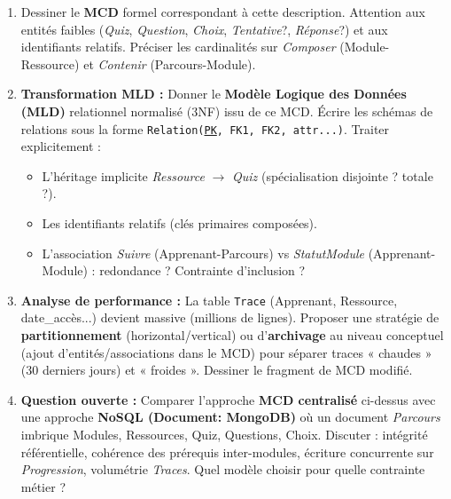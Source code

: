 \documentclass[11pt]{article}
\begin{document}
\begin{exercice}
\begin{enumerate}
    \item Dessiner le \textbf{MCD} formel correspondant à cette description. Attention aux entités faibles (\textit{Quiz}, \textit{Question}, \textit{Choix}, \textit{Tentative}?, \textit{Réponse}?) et aux identifiants relatifs. Préciser les cardinalités sur \textit{Composer} (Module-Ressource) et \textit{Contenir} (Parcours-Module).
    \item \textbf{Transformation MLD :} Donner le \textbf{Modèle Logique des Données (MLD)} relationnel normalisé (3NF) issu de ce MCD. Écrire les schémas de relations sous la forme \texttt{Relation(\underline{PK}, FK1, FK2, attr...)}. Traiter explicitement :
        \begin{itemize}
            \item L'héritage implicite \textit{Ressource} $\to$ \textit{Quiz} (spécialisation disjointe ? totale ?).
            \item Les identifiants relatifs (clés primaires composées).
            \item L'association \textit{Suivre} (Apprenant-Parcours) vs \textit{StatutModule} (Apprenant-Module) : redondance ? Contrainte d'inclusion ?
        \end{itemize}
    \item \textbf{Analyse de performance :} La table \texttt{Trace} (Apprenant, Ressource, date\_accès...) devient massive (millions de lignes). Proposer une stratégie de \textbf{partitionnement} (horizontal/vertical) ou d'\textbf{archivage} au niveau conceptuel (ajout d'entités/associations dans le MCD) pour séparer traces « chaudes » (30 derniers jours) et « froides ». Dessiner le fragment de MCD modifié.
    \item \textbf{Question ouverte :} Comparer l'approche \textbf{MCD centralisé} ci-dessus avec une approche \textbf{NoSQL (Document: MongoDB)} où un document \textit{Parcours} imbrique Modules, Ressources, Quiz, Questions, Choix. Discuter : intégrité référentielle, cohérence des prérequis inter-modules, écriture concurrente sur \textit{Progression}, volumétrie \textit{Traces}. Quel modèle choisir pour quelle contrainte métier ?
\end{enumerate}
\end{exercice}
\end{document}
